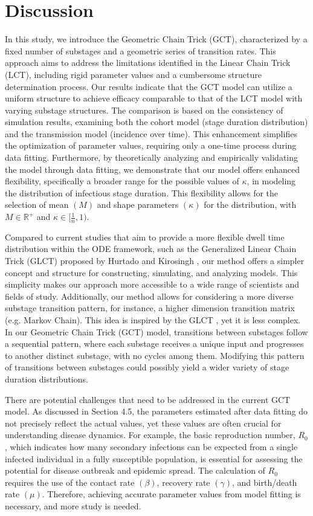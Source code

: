 \documentclass[12pt]{article}
\begin{document}
\section{Discussion}
In this study, we introduce the Geometric Chain Trick (GCT), characterized by a fixed number of substages and a geometric series of transition rates. This approach aims to address the limitations identified in the Linear Chain Trick (LCT), including rigid parameter values and a cumbersome structure determination process. Our results indicate that the GCT model can utilize a uniform structure to achieve efficacy comparable to that of the LCT model with varying substage structures. The comparison is based on the consistency of simulation results, examining both the cohort model (stage duration distribution) and the transmission model (incidence over time). This enhancement simplifies the optimization of parameter values, requiring only a one-time process during data fitting. Furthermore, by theoretically analyzing and empirically validating the model through data fitting, we demonstrate that our model offers enhanced flexibility, specifically a broader range for the possible values of $\kappa$, in modeling the distribution of infectious stage duration. This flexibility allows for the selection of mean $(M)$ and shape parameters $(\kappa)$ for the distribution, with $M \in \mathbb{R}^+$ and $\kappa \in [\frac{1}{n}, 1)$.

Compared to current studies that aim to provide a more flexible dwell time distribution within the ODE framework, such as the Generalized Linear Chain Trick (GLCT) proposed by Hurtado and Kirosingh \cite{hurtado2019generalizations}, our method offers a simpler concept and structure for constructing, simulating, and analyzing models. This simplicity makes our approach more accessible to a wide range of scientists and fields of study. Additionally, our method allows for considering a more diverse substage transition pattern, for instance, a higher dimension transition matrix (e.g. Markov Chain). This idea is inspired by the GLCT \cite{hurtado2019generalizations}\cite{hurtado2021building}, yet it is less complex. In our Geometric Chain Trick (GCT) model, transitions between substages follow a sequential pattern, where each substage receives a unique input and progresses to another distinct substage, with no cycles among them. Modifying this pattern of transitions between substages could possibly yield a wider variety of stage duration distributions.

There are potential challenges that need to be addressed in the current GCT model. As discussed in Section 4.5, the parameters estimated after data fitting do not precisely reflect the actual values, yet these values are often crucial for understanding disease dynamics. For example, the basic reproduction number, $R_0$, which indicates how many secondary infections can be expected from a single infected individual in a fully susceptible population, is essential for assessing the potential for disease outbreak and epidemic spread. The calculation of $R_0$ requires the use of the contact rate $(\beta)$, recovery rate $(\gamma)$, and birth/death rate $(\mu)$. Therefore, achieving accurate parameter values from model fitting is necessary, and more study is needed.
\end{document}
